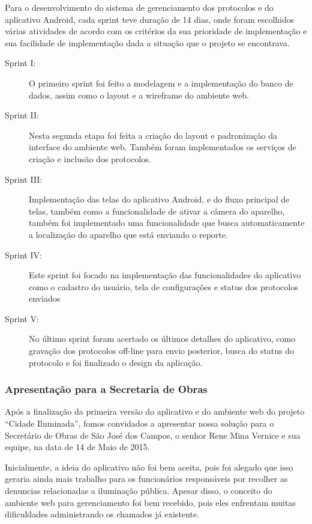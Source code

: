 \documentclass[
	article,			%
	11pt,				%
	oneside,			%
	a4paper,			%
	english,			%
	brazil,				%
	sumario=tradicional
	]{abntex2}
\begin{document}
Para o desenvolvimento do sistema de gerenciamento dos protocolos e do aplicativo Android, cada sprint teve duração de 14 dias, onde foram escolhidos várias atividades de acordo com os critérios da sua prioridade de implementação e sua facilidade de implementação dada a situação que o projeto se encontrava.

\begin{description}
\item[Sprint I:]
O primeiro sprint foi feito a modelagem e a implementação do banco de dados, assim como o layout e a wireframe do ambiente web.

\item[Sprint II:]
Nesta segunda etapa foi feita a criação do layout e padronização da interface do ambiente web.
Também foram implementados os serviços de criação e inclusão dos protocolos.

\item[Sprint III:]
Implementação das telas do aplicativo Android, e do fluxo principal de telas, também como a funcionalidade de ativar a câmera do aparelho, também foi implementado uma funcionalidade que busca automaticamente a localização do aparelho que está enviando o reporte.

\item[Sprint IV:]
Este sprint foi focado na implementação das funcionalidades do aplicativo como o cadastro do usuário, tela de configurações e status dos protocolos enviados

\item[Sprint V:]
No último sprint foram acertado os últimos detalhes do aplicativo, como gravação dos protocolos off-line para envio posterior, busca do status do protocolo e foi finalizado o design da aplicação.
\end{description}

\subsubsection{Apresentação para a Secretaria de Obras}

Após a finalização da primeira versão do aplicativo e do ambiente web do projeto “Cidade Iluminada”, fomos convidados a apresentar nossa solução para o Secretário de Obras de São José dos Campos, o senhor Rene Mina Vernice e sua equipe, na data de 14 de Maio de 2015.

Inicialmente, a ideia do aplicativo não foi bem aceita, pois foi alegado que isso geraria ainda mais trabalho para os funcionários responsáveis por recolher as denuncias relacionadas a iluminação pública.
Apesar disso, o conceito do ambiente web para gerenciamento foi bem recebido, pois eles enfrentam muitas dificuldades administrando os chamados já existente.
\end{document}
